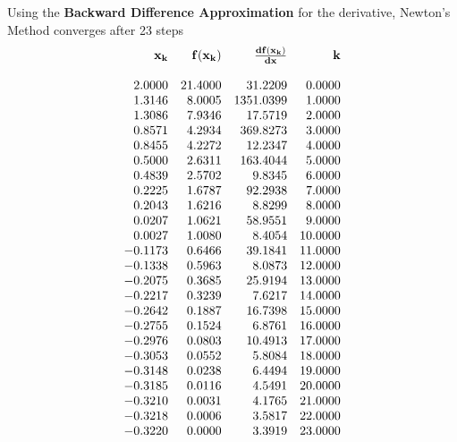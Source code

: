Using the \textbf{Backward Difference Approximation} for the derivative, Newton's Method converges after 23 steps
\begin{equation}
\begin{array}{rrrr}
{\bf x_k} & {\bf f(x_k) } &   {\bf \frac{df(x_k)}{dx}} &  {\bf k} \\
\\
2.0000 & 21.4000 & 31.2209 & 0.0000 \\
1.3146 & 8.0005 & 1351.0399 & 1.0000 \\
1.3086 & 7.9346 & 17.5719 & 2.0000 \\
0.8571 & 4.2934 & 369.8273 & 3.0000 \\
0.8455 & 4.2272 & 12.2347 & 4.0000 \\
0.5000 & 2.6311 & 163.4044 & 5.0000 \\
0.4839 & 2.5702 & 9.8345 & 6.0000 \\
0.2225 & 1.6787 & 92.2938 & 7.0000 \\
0.2043 & 1.6216 & 8.8299 & 8.0000 \\
0.0207 & 1.0621 & 58.9551 & 9.0000 \\
0.0027 & 1.0080 & 8.4054 & 10.0000 \\
-0.1173 & 0.6466 & 39.1841 & 11.0000 \\
-0.1338 & 0.5963 & 8.0873 & 12.0000 \\
-0.2075 & 0.3685 & 25.9194 & 13.0000 \\
-0.2217 & 0.3239 & 7.6217 & 14.0000 \\
-0.2642 & 0.1887 & 16.7398 & 15.0000 \\
-0.2755 & 0.1524 & 6.8761 & 16.0000 \\
-0.2976 & 0.0803 & 10.4913 & 17.0000 \\
-0.3053 & 0.0552 & 5.8084 & 18.0000 \\
-0.3148 & 0.0238 & 6.4494 & 19.0000 \\
-0.3185 & 0.0116 & 4.5491 & 20.0000 \\
-0.3210 & 0.0031 & 4.1765 & 21.0000 \\
-0.3218 & 0.0006 & 3.5817 & 22.0000 \\
-0.3220 & 0.0000 & 3.3919 & 23.0000 \\
\end{array}
\end{equation}
\Qed

